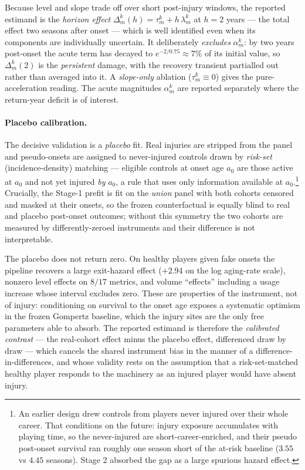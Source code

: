 Because level and slope trade off over short post-injury windows, the reported estimand is the \emph{horizon effect} $\Delta^k_m(h) = \tau^k_m + h\,\lambda^k_m$ at $h = 2$ years --- the total effect two seasons after onset --- which is well identified even when its components are individually uncertain.  It deliberately \emph{excludes} $\alpha^k_m$: by two years post-onset the acute term has decayed to $e^{-2/0.75} \approx 7\%$ of its initial value, so $\Delta^k_m(2)$ is the \emph{persistent} damage, with the recovery transient partialled out rather than averaged into it.  A \emph{slope-only} ablation ($\tau^k_m \equiv 0$) gives the pure-acceleration reading.  The acute magnitudes $\alpha^k_m$ are reported separately where the return-year deficit is of interest.

\paragraph{Placebo calibration.}  The decisive validation is a \emph{placebo} fit.  Real injuries are stripped from the panel and pseudo-onsets are assigned to never-injured controls drawn by \emph{risk-set} (incidence-density) matching --- eligible controls at onset age $a_0$ are those active at $a_0$ and not yet injured \emph{by} $a_0$, a rule that uses only information available at $a_0$.\footnote{An earlier design drew controls from players never injured over their whole career.  That conditions on the future: injury exposure accumulates with playing time, so the never-injured are short-career-enriched, and their pseudo post-onset survival ran roughly one season short of the at-risk baseline ($3.55$ vs $4.45$ seasons).  Stage 2 absorbed the gap as a large spurious hazard effect.}  Crucially, the Stage-1 prefit is fit on the \emph{union} panel with both cohorts censored and masked at their onsets, so the frozen counterfactual is equally blind to real and placebo post-onset outcomes; without this symmetry the two cohorts are measured by differently-zeroed instruments and their difference is not interpretable.

The placebo does not return zero.  On healthy players given fake onsets the pipeline recovers a large exit-hazard effect ($+2.94$ on the log aging-rate scale), nonzero level effects on $8/17$ metrics, and volume ``effects'' including a usage increase whose interval excludes zero.  These are properties of the instrument, not of injury: conditioning on survival to the onset age exposes a systematic optimism in the frozen Gompertz baseline, which the injury sites are the only free parameters able to absorb.  The reported estimand is therefore the \emph{calibrated contrast} --- the real-cohort effect minus the placebo effect, differenced draw by draw --- which cancels the shared instrument bias in the manner of a difference-in-differences, and whose validity rests on the assumption that a risk-set-matched healthy player responds to the machinery as an injured player would have absent injury.

